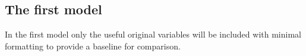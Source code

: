 \documentclass[table]{article}
\newenvironment{Shaded}{\begin{snugshade}}{\end{snugshade}}
\newcommand{\KeywordTok}[1]{\textcolor[rgb]{0.13,0.29,0.53}{\textbf{#1}}}
\newcommand{\DataTypeTok}[1]{\textcolor[rgb]{0.13,0.29,0.53}{#1}}
\newcommand{\DecValTok}[1]{\textcolor[rgb]{0.00,0.00,0.81}{#1}}
\newcommand{\StringTok}[1]{\textcolor[rgb]{0.31,0.60,0.02}{#1}}
\newcommand{\OperatorTok}[1]{\textcolor[rgb]{0.81,0.36,0.00}{\textbf{#1}}}
\newcommand{\NormalTok}[1]{#1}
\begin{document}
\subsection{The first model}\label{the-first-model}

In the first model only the useful original variables will be included
with minimal formatting to provide a baseline for comparison.
\hfill\break

\begin{Shaded}
\end{Shaded}
\end{document}

